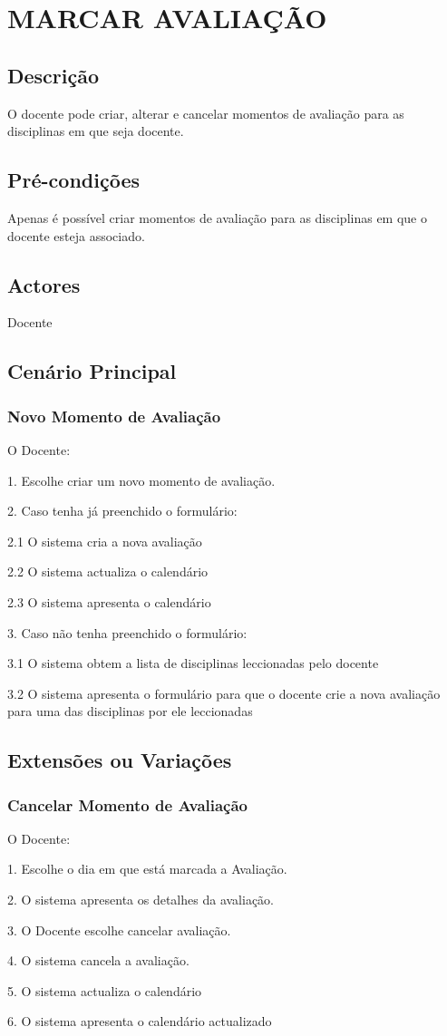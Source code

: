 \section{MARCAR AVALIAÇÃO}
\subsection{Descrição} 
O docente pode criar, alterar e cancelar momentos de avaliação para as disciplinas em que seja docente.

\subsection{Pré-condições}
Apenas é possível criar momentos de avaliação para as disciplinas em que o docente esteja associado.

\subsection{Actores} 
Docente 

\subsection{Cenário Principal}
 \subsubsection{Novo Momento de Avaliação}
O Docente:

1. Escolhe criar um novo momento de avaliação.

2. Caso tenha já preenchido o formulário:

2.1 O sistema cria a nova avaliação

2.2 O sistema actualiza o calendário

2.3 O sistema apresenta o calendário

3. Caso não tenha preenchido o formulário:

3.1 O sistema obtem a lista de disciplinas leccionadas pelo docente

3.2 O sistema apresenta o formulário para que o docente crie a nova avaliação para uma das disciplinas por ele leccionadas




\subsection{Extensões ou Variações} 
\subsubsection{Cancelar Momento de Avaliação}

O Docente:

1. Escolhe o dia em que está marcada a Avaliação.

2. O sistema apresenta os detalhes da avaliação.

3. O Docente escolhe cancelar avaliação.

4. O sistema cancela a avaliação.

5. O sistema actualiza o calendário

6. O sistema apresenta o calendário actualizado